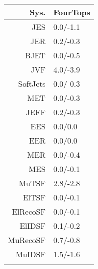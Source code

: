 \begin{tabular}{r|p{.08\linewidth}}
\toprule
 Sys.  & FourTops \\
\toprule
JES  & 0.0/-1.1 \\
JER  & 0.2/-0.3 \\
BJET  & 0.0/-0.5 \\
JVF  & 4.0/-3.9 \\
SoftJets  & 0.0/-0.3 \\
MET  & 0.0/-0.3 \\
JEFF  & 0.2/-0.3 \\
EES  & 0.0/0.0 \\
EER  & 0.0/0.0 \\
MER  & 0.0/-0.4 \\
MES  & 0.0/-0.1 \\
MuTSF  & 2.8/-2.8 \\
ElTSF  & 0.0/-0.1 \\
ElRecoSF  & 0.0/-0.1 \\
ElIDSF  & 0.1/-0.2 \\
MuRecoSF  & 0.7/-0.8 \\
MuIDSF  & 1.5/-1.6 \\
 \\
\bottomrule
\end{tabular}
